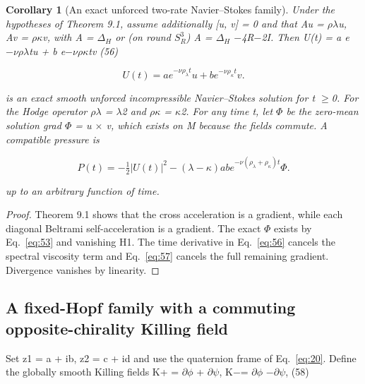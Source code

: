 \documentclass[10pt,letterpaper]{article}
\newtheorem{corollary}[theorem]{Corollary}
\theoremstyle{remark}
\begin{document}
\begin{corollary}[An exact unforced two-rate Navier–Stokes family]

Under the hypotheses of Theorem 9.1, assume additionally [u, v] = 0 and that Au = \(\rho \lambda \)u, Av = \(\rho \kappa \)v, with A = \(\Delta_H\) or (on round \(S_R^3\)) A = \(\Delta_H\) \(- \)4R\(- \)2I. Then U(t) = a e\(- \nu \rho \lambda \)tu + b e\(- \nu \rho \kappa \)tv (56)


\begin{equation}
\tag{56}\label{eq:56}
U(t)=ae^{-\nu\rho_\lambda t}u+be^{-\nu\rho_\kappa t}v.
\end{equation}

is an exact smooth unforced incompressible Navier–Stokes solution for t \(\ge \)0. For the Hodge operator \(\rho \lambda \) = \(\lambda \)2 and \(\rho \kappa \) = \(\kappa \)2. For any time t, let \(\Phi \) be the zero-mean solution grad \(\Phi \) = u \(\times \) v, which exists on M because the fields commute. A compatible pressure is



\begin{equation}
\tag{57}\label{eq:57}
P(t)=-\tfrac12|U(t)|^2-(\lambda-\kappa)ab e^{-\nu(\rho_\lambda+\rho_\kappa)t}\Phi.
\end{equation}

up to an arbitrary function of time.


\end{corollary}

\begin{proof}
Theorem 9.1 shows that the cross acceleration is a gradient, while each diagonal Beltrami self-acceleration is a gradient. The exact \(\Phi \) exists by Eq.~\eqref{eq:53} and vanishing H1. The time derivative in Eq.~\eqref{eq:56} cancels the spectral viscosity term and Eq.~\eqref{eq:57} cancels the full remaining gradient. Divergence vanishes by linearity.

\end{proof}

\subsection{A fixed-Hopf family with a commuting opposite-chirality Killing field}

Set z1 = a + ib, z2 = c + id and use the quaternion frame of Eq.~\eqref{eq:20}. Define the globally smooth Killing fields K+ = \(\partial \phi \) + \(\partial \psi \), K\(- \)= \(\partial \phi \) \(- \partial \psi \), (58)
\end{document}
